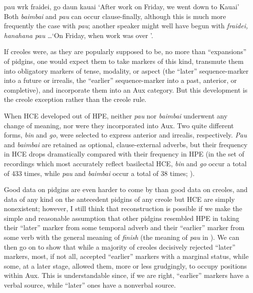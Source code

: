 \ea\label{ex:2:93}
pau wrk fraidei, go daun kauai
\glt `After work on Friday, we went down to Kauai'
\z
Both \textit{baimbai }and \textit{pau }can occur clause-finally, although this is much more frequently the case with \textit{pau}; another speaker might well have begun  with \textit{fraidei, hanahana pau} \ldots\xspace `On Friday, when work was over \textellipsis'.

If creoles were, as they are popularly supposed to be, no more than ``expansions'' of pidgins, one would expect them to take markers of this kind, transmute them into obligatory markers of tense, modal\-ity, or aspect (the ``later'' sequence-marker into a future or irrealis, the ``earlier'' sequence-marker into a past, anterior, or completive), and incorporate them into an Aux category. But this development is the creole exception rather than the creole rule.

When HCE developed out of HPE, neither \textit{pau} nor \textit{baimbai} underwent any change of meaning, nor were they incorporated into Aux. Two quite different forms, \textit{bin} and \textit{go}, were selected to express anterior and irrealis, respectively. \textit{Pau} and \textit{baimbai} are retained as optional, clause-external adverbs, but their frequency in HCE drops dramatically compared with their frequency in HPE (in the set of recordings which most accurately reflect basilectal HCE, \textit{bin} and \textit{go} occur a total of 433 times, while \textit{pau} and \textit{baimbai} occur a total of 38 times; \citealt[Tables 3.1, 3.6, 3.9]{Bickerton1977}).

Good data on pidgins are even harder to come by than good data on creoles, and data of any kind on the antecedent pidgins of any creole but HCE are simply nonexistent; however, I still think that reconstruction is possible if we make the simple and reasonable assump\-tion that other pidgins resembled HPE in taking their ``later'' marker from some temporal adverb and their ``earlier'' marker from some verb with the general meaning of \textit{finish} (the meaning of \textit{pau} in ). We can then go on to show that while a majority of creoles decisively rejected ``later'' markers, most, if not all, accepted ``earlier'' markers with a marginal status, while some, at a later stage, allowed them, more or less grudgingly, to occupy positions within Aux. This is under\-standable since, if we are right, ``earlier'' markers have a verbal source, while ``later'' ones have a nonverbal source.

